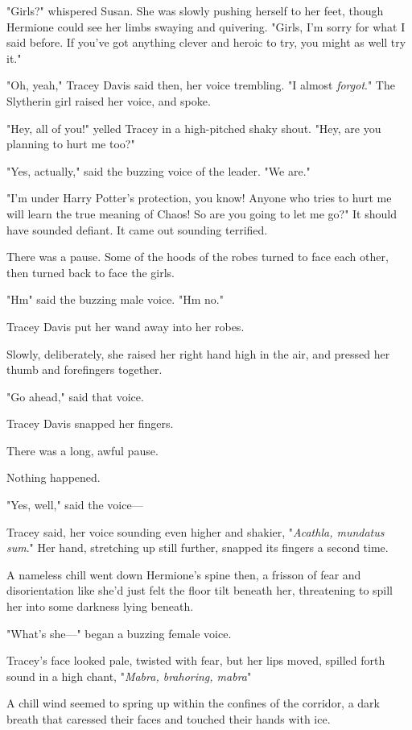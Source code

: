 "Girls?" whispered Susan. She was slowly pushing herself to her feet, though
Hermione could see her limbs swaying and quivering. "Girls, I'm sorry for what
I said before. If you've got anything clever and heroic to try, you might as
well try it."

"Oh, yeah," Tracey Davis said then, her voice trembling. "I almost
\emph{forgot}." The Slytherin girl raised her voice, and spoke.

"Hey, all of you!" yelled Tracey in a high-pitched shaky shout. "Hey, are you
planning to hurt me too?"

"Yes, actually," said the buzzing voice of the leader. "We are."

"I'm under Harry Potter's protection, you know! Anyone who tries to hurt me
will learn the true meaning of Chaos! So are you going to let me go?" It should
have sounded defiant. It came out sounding terrified.

There was a pause. Some of the hoods of the robes turned to face each other,
then turned back to face the girls.

"Hm{\el}" said the buzzing male voice. "Hm{\el} no."

Tracey Davis put her wand away into her robes.

Slowly, deliberately, she raised her right hand high in the air, and pressed
her thumb and forefingers together.

"Go ahead," said that voice.

Tracey Davis snapped her fingers.

There was a long, awful pause.

Nothing happened.

"Yes, well," said the voice---

Tracey said, her voice sounding even higher and shakier, "\emph{Acathla,
mundatus sum}." Her hand, stretching up still further, snapped its fingers a
second time.

A nameless chill went down Hermione's spine then, a frisson of fear and
disorientation like she'd just felt the floor tilt beneath her, threatening to
spill her into some darkness lying beneath.

"What's she\mbox{---}" began a buzzing female voice.

Tracey's face looked pale, twisted with fear, but her lips moved, spilled forth
sound in a high chant, "\emph{Mabra, brahoring, mabra{\el}}"

A chill wind seemed to spring up within the confines of the corridor, a dark
breath that caressed their faces and touched their hands with ice.

